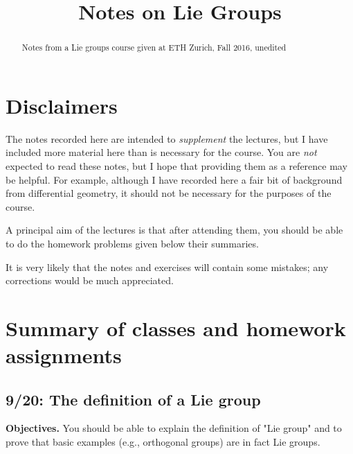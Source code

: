 \documentclass[reqno]{amsart} 
\title{Notes on Lie Groups}
\begin{document}
\begin{abstract}
  Notes from a Lie groups course given at ETH Zurich, Fall 2016, unedited
\end{abstract}

\maketitle
\tableofcontents

\section{Disclaimers\label{sec:disclaimers}}
\label{sec:org8827c4a}
The notes recorded here are intended to \emph{supplement} the lectures, but I have included more material here than is necessary for the course.  You are \emph{not} expected to read these notes, but I hope that providing them as a reference may be helpful.  For example, although I have recorded here a fair bit of background from differential geometry, it should not be necessary for the purposes of the course.

A principal aim of the lectures is that after attending them, you should be able to do the homework problems given below their summaries.

It is very likely that the notes and exercises will contain some mistakes; any corrections would be much appreciated.

\section{Summary of classes and homework assignments}
\label{sec:orgeacc8f6}
\newpage
\subsection{9/20: The definition of a Lie group}
\label{sec:org5df22f0}
\textbf{Objectives.}  You should be able to explain the definition of "Lie group" and to prove that basic examples (e.g., orthogonal groups) are in fact Lie groups.
\end{document}
